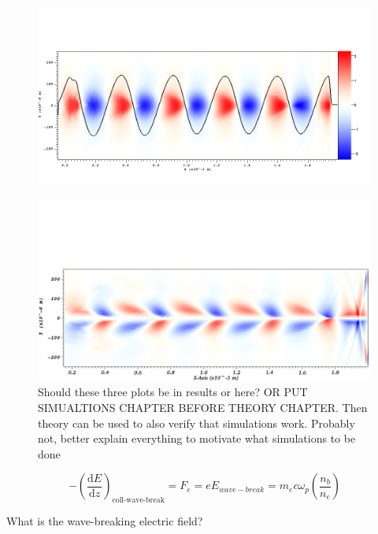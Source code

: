 \begin{figure}
\centering
\includegraphics[width=\textwidth]{Ex_nonlinear.png}
\end{figure}
\begin{figure}
\centering
\includegraphics[width=\textwidth]{Ey_nonlinear.png}
\caption{Should these three plots be in results or here? OR PUT SIMUALTIONS CHAPTER BEFORE THEORY CHAPTER. Then theory can be used to also verify that simulations work. Probably not, better explain everything to motivate what simulations to be done }
\end{figure}
\begin{equation}
-\left(\frac{\mathrm{d}E}{\mathrm{d}z}\right)_{\text{coll-wave-break}}=F_e=eE_{wave-break}=m_e c\omega_{p}\left(\frac{n_b}{n_e}\right)
\end{equation}

What is the wave-breaking electric field?



